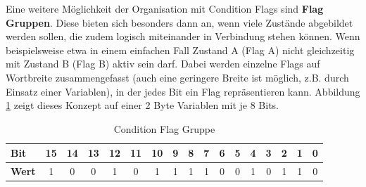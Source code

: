 \documentclass{llncs}
\begin{document}
Eine weitere Möglichkeit der Organisation mit Condition Flags sind \textbf{Flag Gruppen}. Diese bieten sich besonders dann an, wenn viele Zustände abgebildet werden sollen, die zudem logisch miteinander in Verbindung stehen können. Wenn beispielsweise etwa in einem einfachen Fall Zustand A (Flag A) nicht gleichzeitig mit Zustand B (Flag B) aktiv sein darf. Dabei werden einzelne Flags auf Wortbreite zusammengefasst (auch eine geringere Breite ist möglich, z.B. durch Einsatz einer Variablen), in der jedes Bit ein Flag repräsentieren kann. Abbildung \ref{tab:FlagGroup} zeigt dieses Konzept auf einer 2 Byte Variablen mit je 8 Bits.\\
\begin{table}[h]
	\centering %
	\def\arraystretch{1.5} %
	\setlength{\tabcolsep}{0.5em} %
		\begin{tabular}[h]{|l|c|c|c|c|c|c|c|c|c|c|c|c|c|c|c|c|}
			\hline
			\textbf{Bit} & \cellcolor{hellgrau}15 & \cellcolor{hellgrau}14 & \cellcolor{hellgrau}13 & \cellcolor{hellgrau}12 & \cellcolor{hellgrau}11 & \cellcolor{hellgrau}10 & \cellcolor{hellgrau}9 & \cellcolor{hellgrau}8 & \cellcolor{hellgrau}7 & \cellcolor{hellgrau}6 & \cellcolor{hellgrau}5 & \cellcolor{hellgrau}4 & \cellcolor{hellgrau}3 & \cellcolor{hellgrau}2 & \cellcolor{hellgrau}1 & \cellcolor{hellgrau}0 \\
			\hline
			\textbf{Wert} & 1 & 0 & 0 & 1 & 0 & 1 & 1 & 1 & 1 & 0 & 0 & 1 & 0 & 1 & 1 & 0 \\
			\hline
	\end{tabular}%
	\caption{\label{tab:FlagGroup} Condition Flag Gruppe \autocite[vgl.][85]{Cooling2017}}
\end{table}
\end{document}
